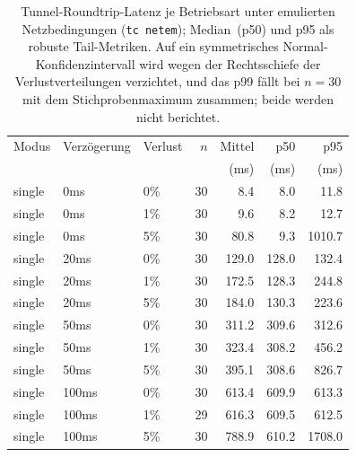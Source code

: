 \begin{table}[t]
  \centering
  \caption{Tunnel-Roundtrip-Latenz je Betriebsart unter emulierten Netzbedingungen (\texttt{tc netem}); Median~(p50) und p95 als robuste Tail-Metriken. Auf ein symmetrisches Normal-Konfidenzintervall wird wegen der Rechtsschiefe der Verlustverteilungen verzichtet, und das p99 f\"allt bei $n=30$ mit dem Stichprobenmaximum zusammen; beide werden nicht berichtet.}
  \label{tab:latency}
  \begin{tabular}{lllrrrr}
    \toprule
    Modus & Verzögerung & Verlust & $n$ & Mittel & p50 & p95 \\
     &  &  &  & (ms) & (ms) & (ms) \\
    \midrule
    single & 0ms & 0\% & 30 & 8.4 & 8.0 & 11.8 \\
    single & 0ms & 1\% & 30 & 9.6 & 8.2 & 12.7 \\
    single & 0ms & 5\% & 30 & 80.8 & 9.3 & 1010.7 \\
    single & 20ms & 0\% & 30 & 129.0 & 128.0 & 132.4 \\
    single & 20ms & 1\% & 30 & 172.5 & 128.3 & 244.8 \\
    single & 20ms & 5\% & 30 & 184.0 & 130.3 & 223.6 \\
    single & 50ms & 0\% & 30 & 311.2 & 309.6 & 312.6 \\
    single & 50ms & 1\% & 30 & 323.4 & 308.2 & 456.2 \\
    single & 50ms & 5\% & 30 & 395.1 & 308.6 & 826.7 \\
    single & 100ms & 0\% & 30 & 613.4 & 609.9 & 613.3 \\
    single & 100ms & 1\% & 29 & 616.3 & 609.5 & 612.5 \\
    single & 100ms & 5\% & 30 & 788.9 & 610.2 & 1708.0 \\
    \bottomrule
  \end{tabular}
\end{table}
